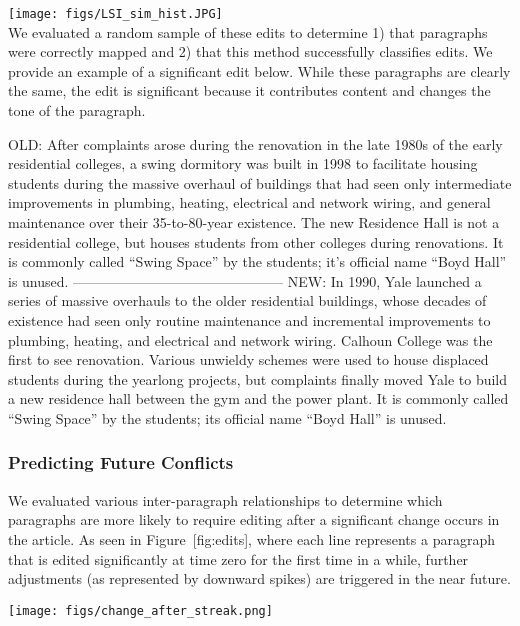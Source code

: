 \texttt{[image: figs/LSI\_sim\_hist.JPG]}\\

We evaluated a random sample of these edits to determine 1) that
paragraphs were correctly mapped and 2) that this method successfully
classifies edits. We provide an example of a significant edit below.
While these paragraphs are clearly the same, the edit is significant
because it contributes content and changes the tone of the paragraph.

OLD: After complaints arose during the renovation in the late 1980s of
the early residential colleges, a swing dormitory was built in 1998 to
facilitate housing students during the massive overhaul of buildings
that had seen only intermediate improvements in plumbing, heating,
electrical and network wiring, and general maintenance over their
35-to-80-year existence. The new Residence Hall is not a residential
college, but houses students from other colleges during renovations. It
is commonly called ``Swing Space'' by the students; it's official name
``Boyd Hall'' is unused. ---------------------------------------------
NEW: In 1990, Yale launched a series of massive overhauls to the older
residential buildings, whose decades of existence had seen only routine
maintenance and incremental improvements to plumbing, heating, and
electrical and network wiring. Calhoun College was the first to see
renovation. Various unwieldy schemes were used to house displaced
students during the yearlong projects, but complaints finally moved Yale
to build a new residence hall between the gym and the power plant. It is
commonly called ``Swing Space'' by the students; its official name
``Boyd Hall'' is unused.

\subsubsection{Predicting Future
Conflicts}\label{predicting-future-conflicts}

We evaluated various inter-paragraph relationships to determine which
paragraphs are more likely to require editing after a significant change
occurs in the article. As seen in Figure~{[}fig:edits{]}, where each
line represents a paragraph that is edited significantly at time zero
for the first time in a while, further adjustments (as represented by
downward spikes) are triggered in the near future.

\texttt{[image: figs/change\_after\_streak.png]}\\

